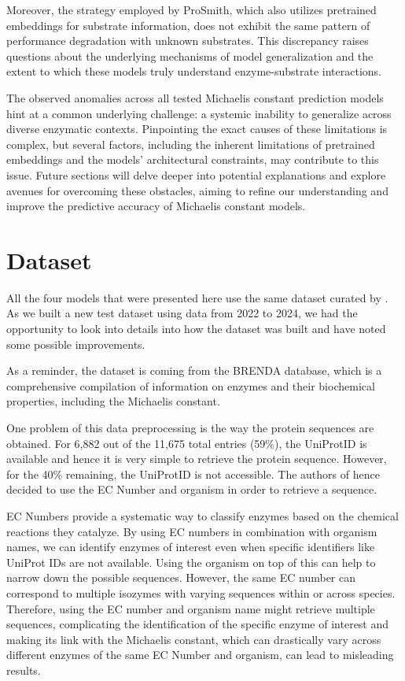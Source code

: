 Moreover, the strategy employed by ProSmith, which also utilizes pretrained embeddings for substrate information, does not exhibit the same pattern of performance degradation with unknown substrates. This discrepancy raises questions about the underlying mechanisms of model generalization and the extent to which these models truly understand enzyme-substrate interactions.

The observed anomalies across all tested Michaelis constant prediction models hint at a common underlying challenge: a systemic inability to generalize across diverse enzymatic contexts. Pinpointing the exact causes of these limitations is complex, but several factors, including the inherent limitations of pretrained embeddings and the models' architectural constraints, may contribute to this issue. Future sections will delve deeper into potential explanations and explore avenues for overcoming these obstacles, aiming to refine our understanding and improve the predictive accuracy of Michaelis constant models.

\section{Dataset}

All the four models that were presented here use the same dataset curated by \citeauthor{km1}. As we 
built a new test dataset using data from 2022 to 2024, we had the opportunity to look into details into how the dataset was built and have noted some possible improvements.

As a reminder, the dataset is coming from the BRENDA database, which is a comprehensive compilation of information on enzymes and their biochemical properties, including the Michaelis constant.

One problem of this data preprocessing is the way the protein sequences are obtained. For 6,882 out of the
11,675 total entries (59\%), the UniProtID is available and hence it is very simple to retrieve the protein sequence. However, for the 40\% remaining, the UniProtID is not accessible. The authors of \citeauthor{km1} hence decided to use the EC Number and organism in order to retrieve a sequence.

EC Numbers provide a systematic way to classify enzymes based on the chemical reactions they catalyze. 
By using EC numbers in combination with organism names, we can identify enzymes of interest even when 
specific identifiers like UniProt IDs are not available. Using the organism on top of this can help to narrow down the possible sequences. However, the same EC number can correspond to multiple isozymes with varying sequences within or across species. Therefore, using the EC number and organism name might retrieve multiple sequences, complicating the identification of the specific enzyme of interest and making its link with the Michaelis constant, which can drastically vary across different enzymes of the same EC Number and organism, can lead to misleading results.

